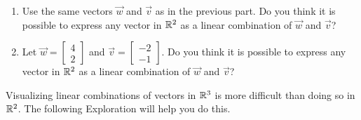 \documentclass{ximera}
\begin{document}
\begin{exploration}
\begin{enumerate}
\item
Use the same vectors $\vec{w}$ and $\vec{v}$ as in the previous part.  Do you think it is possible to express any vector in $\mathbb{R}^2$ as a linear combination of $\vec{w}$ and $\vec{v}$?  

\item Let $\vec{w}=\begin{bmatrix}4\\2\end{bmatrix}$ and $\vec{v}=\begin{bmatrix}-2\\-1\end{bmatrix}$.  Do you think it is possible to express any vector in $\mathbb{R}^2$ as a linear combination of $\vec{w}$ and $\vec{v}$?  
\end{enumerate}
    
\end{exploration}

Visualizing linear combinations of vectors in $\mathbb{R}^3$ is more difficult than doing so in $\mathbb{R}^2$.  The following Exploration will help you do this.
\end{document}
